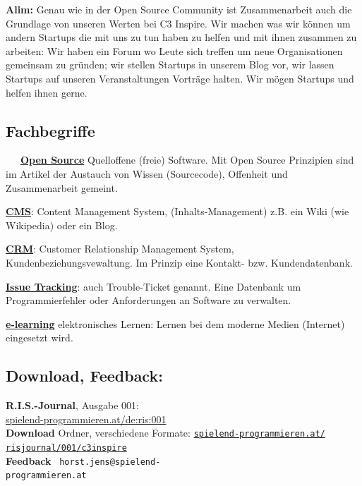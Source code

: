 \textbf{Alim:} Genau wie in der Open Source Community ist Zusammenarbeit auch 
die Grundlage von unseren Werten bei C3 Inspire. Wir machen was wir 
können um andern Startups die mit uns zu tun haben zu helfen und mit 
ihnen zusammen zu arbeiten: Wir haben ein Forum wo Leute sich treffen 
um neue Organisationen gemeinsam zu gründen; wir stellen Startups in 
unserem Blog vor,  wir lassen Startups auf unseren Veranstaltungen 
Vorträge halten. Wir mögen Startups und helfen ihnen gerne.


\subsection*{Fachbegriffe}
~~~\href{https://de.wikipedia.org/wiki/Portal:Freie_Software}{\textbf{Open Source}} Quelloffene (freie) Software. Mit Open Source Prinzipien sind im Artikel der Austauch von Wissen (Sourcecode), Offenheit und Zusammenarbeit gemeint. 

\href{https://de.wikipedia.org/wiki/Content-Management-System}{\textbf{CMS}}: Content Management System, (Inhalts-Management) z.B. ein Wiki (wie Wikipedia) oder ein Blog. 

\href{https://de.wikipedia.org/wiki/Customer-Relationship-Management}{\textbf{CRM}}: Customer Relationship Management System, Kundenbeziehungsvewaltung. Im Prinzip eine Kontakt- bzw. Kundendatenbank.

\href{https://de.wikipedia.org/wiki/Issue-Tracking-System}{\textbf{Issue Tracking}}: auch Trouble-Ticket genannt. Eine Datenbank um Programmierfehler oder Anforderungen an Software zu verwalten. 

\href{https://de.wikipedia.org/wiki/ELearning}{\textbf{e-learning}} elektronisches Lernen: Lernen bei dem moderne Medien (Internet) eingesetzt wird.

\subsection*{Download, Feedback:}
\textbf{R.I.S.-Journal}, Ausgabe 001: \\
\href{http://spielend-programmieren.at/de:ris:001}{spielend-programmieren.at/de:ris:001}\\
\textbf{Download} Ordner, verschiedene Formate: \href{http://spielend-programmieren.at/risjournal/001/c3inspire}{\texttt{spielend-programmieren.at/\\risjournal/001/c3inspire}} \\
\textbf{Feedback} \Letter\ \texttt{horst.jens@spielend-\\programmieren.at} \\

